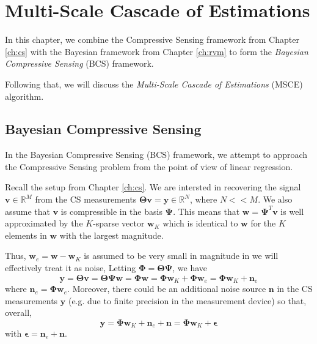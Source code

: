 \chapter{Multi-Scale Cascade of Estimations}
\label{ch:msce}

In this chapter, we combine the Compressive Sensing framework from Chapter \ref{ch:cs} with the Bayesian framework from Chapter \ref{ch:rvm} to form the \emph{Bayesian Compressive Sensing} (BCS) framework.

Following that, we will discuss the \emph{Multi-Scale Cascade of Estimations} (MSCE) algorithm.

\section{Bayesian Compressive Sensing}
In the Bayesian Compressive Sensing (BCS) \cite{ji2008} framework, we attempt to approach the Compressive Sensing problem from the point of view of linear regression.

Recall the setup from Chapter \ref{ch:cs}.
We are intersted in recovering the signal $\bm v\in\mathbb{R}^M$ from the CS measurements $\bm\Theta\bm v = \bm y\in\mathbb{R}^N$, where $N << M$.
We also assume that $\bm v$ is compressible in the basis $\bm \Psi$.
This means that $\bm w = \bm\Psi^T\bm v$ is well approximated by the $K$-sparse vector $\bm w_K$ which is identical to $\bm w$ for the $K$ elements in $\bm w$ with the largest magnitude.

Thus, $\bm w_e = \bm w - \bm w_K$ is assumed to be very small in magnitude in we will effectively treat it as noise,
Letting $\bm\Phi=\bm\Theta\bm\Psi$, we have
\begin{equation*}
  \bm y = \bm\Theta\bm v = \bm\Theta\bm\Psi\bm w = \bm\Phi\bm w = \bm\Phi\bm w_K + \bm\Phi\bm w_e = \bm\Phi\bm w_K + \bm n_e
\end{equation*}
where $\bm n_e = \bm\Phi\bm w_e$.
Moreover, there could be an additional noise source $\bm n$ in the CS measurements $\bm y$ (e.g. due to finite precision in the measurement device) so that, overall,
\begin{equation}
\label{eqn:bcs_setup}
  \bm y = \bm\Phi\bm w_K + \bm n_e + \bm n = \bm\Phi\bm w_K + \bm \epsilon
\end{equation}
with $\bm\epsilon = \bm n_e + \bm n$.

